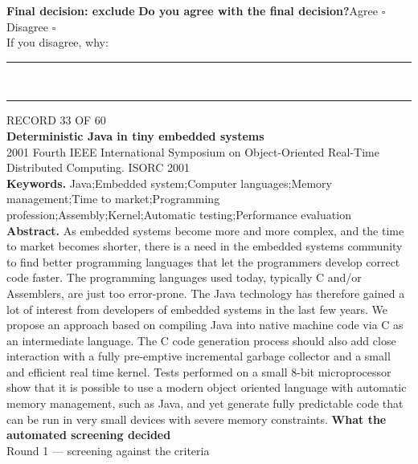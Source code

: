\documentclass[11pt,a4paper]{article}
\begin{document}
{\small\textbf{Final decision: exclude}}
\vspace{2mm}
{\small\textbf{Do you agree with the final decision?}\quad{}Agree $\square$\qquad{}Disagree $\square$}\\[1mm]
{\footnotesize\color{soft}If you disagree, why:}\\[1mm]
\color{rule}\rule{\linewidth}{0.3pt}\\[3mm]\rule{\linewidth}{0.3pt}\color{black}
\clearpage
{\color{soft}\footnotesize RECORD 33 OF 60}\\[1mm]
{\large\bfseries Deterministic Java in tiny embedded systems}\\[1.5mm]
{\color{soft}\small 2001 \textperiodcentered{} Fourth IEEE International Symposium on Object-Oriented Real-Time Distributed Computing. ISORC 2001}\\[2mm]
{\small\textbf{Keywords.} Java;Embedded system;Computer languages;Memory management;Time to market;Programming profession;Assembly;Kernel;Automatic testing;Performance evaluation}\\[2mm]
{\small\textbf{Abstract.} As embedded systems become more and more complex, and the time to market becomes shorter, there is a need in the embedded systems community to find better programming languages that let the programmers develop correct code faster. The programming languages used today, typically C and/or Assemblers, are just too error-prone. The Java technology has therefore gained a lot of interest from developers of embedded systems in the last few years. We propose an approach based on compiling Java into native machine code via C as an intermediate language. The C code generation process should also add close interaction with a fully pre-emptive incremental garbage collector and a small and efficient real time kernel. Tests performed on a small 8-bit microprocessor show that it is possible to use a modern object oriented language with automatic memory management, such as Java, and yet generate fully predictable code that can be run in very small devices with severe memory constraints.}
\vspace{3mm}
\vspace{2.5mm}
{\small\textbf{What the automated screening decided}}\\[2mm]
{\footnotesize\color{soft}Round 1 --- screening against the criteria}\\[0.5mm]
\end{document}
